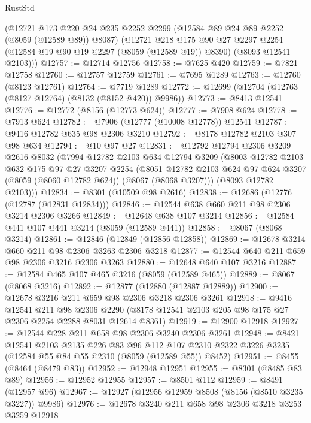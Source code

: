 \begin{lexlean}{RustStd}
\begin{coremodule}
    (@12721
      @173
      @220
      @24
      @235
      @2252
      @2299
      (@12584 @89 @24 @89 @2252 (@8059 (@12589 @89)) @8087)
      (@12721
        @218
        @175
        @90
        @27
        @2297
        @2254
        (@12584 @19 @90 @19 @2297 (@8059 (@12589 @19)) @8390)
        (@8093 @12541 @2103)))
@12757 := @12714 @12756
@12758 := @7625 @420
@12759 := @7821 @12758
@12760 := @12757 @12759
@12761 := @7695 @1289
@12763 := @12760 (@8123 @12761)
@12764 := @7719 @1289
@12772 := @12699 (@12704 (@12763 (@8127 @12764) (@8132 (@8152 @420)) @9986))
@12773 := @8413 @12541
@12776 := @12772 (@8156 (@12773 @624))
@12777 := @7908 @624
@12778 := @7913 @624
@12782 := @7906 (@12777 (@10008 @12778)) @12541
@12787 := @9416 @12782 @635 @98 @2306 @3210
@12792 := @8178 @12782 @2103 @307 @98 @634
@12794 := @10 @97 @27
@12831 := @12792
    @12794
    @2306
    @3209
    @2616
    @8032
    (@7994
      @12782
      @2103
      @634
      @12794
      @3209
      (@8003
        @12782
        @2103
        @632
        @175
        @97
        @27
        @3207
        @2254
        (@8051 @12782 @2103 @624 @97 @624 @3207 (@8059 (@8060 @12782 @624)) (@8067 (@8068 @3207)))
        (@8093 @12782 @2103)))
@12834 := @8301 (@10509 @98 @2616)
@12838 := @12686 (@12776 (@12787 (@12831 @12834)))
@12846 := @12544 @638 @660 @211 @98 @2306 @3214 @2306 @3266
@12849 := @12648 @638 @107 @3214
@12856 := @12584 @441 @107 @441 @3214 (@8059 (@12589 @441))
@12858 := @8067 (@8068 @3214)
@12861 := @12846 (@12849 (@12856 @12858))
@12869 := @12678 @3214 @660 @211 @98 @2306 @3263 @2306 @3218
@12877 := @12544 @640 @211 @659 @98 @2306 @3216 @2306 @3263
@12880 := @12648 @640 @107 @3216
@12887 := @12584 @465 @107 @465 @3216 (@8059 (@12589 @465))
@12889 := @8067 (@8068 @3216)
@12892 := @12877 (@12880 (@12887 @12889))
@12900 := @12678 @3216 @211 @659 @98 @2306 @3218 @2306 @3261
@12918 := @9416
    @12541
    @211
    @98
    @2306
    @2290
    (@8178 @12541 @2103 @205 @98 @175 @27 @2306 @2254 @2288 @8031 @12614 @8361)
@12919 := @12900 @12918
@12927 := @12544 @228 @211 @658 @98 @2306 @3240 @2306 @3261
@12948 := @8421
    @12541
    @2103
    @2135
    @226
    @83
    @96
    @112
    @107
    @2310
    @2322
    @3226
    @3235
    (@12584 @55 @84 @55 @2310 (@8059 (@12589 @55)) @8452)
@12951 := @8455 (@8464 (@8479 @83))
@12952 := @12948 @12951
@12955 := @8301 (@8485 @83 @89)
@12956 := @12952 @12955
@12957 := @8501 @112
@12959 := @8491 (@12957 @96)
@12967 := @12927 (@12956 @12959 @8508 (@8156 (@8510 @3235 @3227)) @9986)
@12976 := @12678 @3240 @211 @658 @98 @2306 @3218 @3253 @3259 @12918

\end{coremodule}
\end{lexlean}

